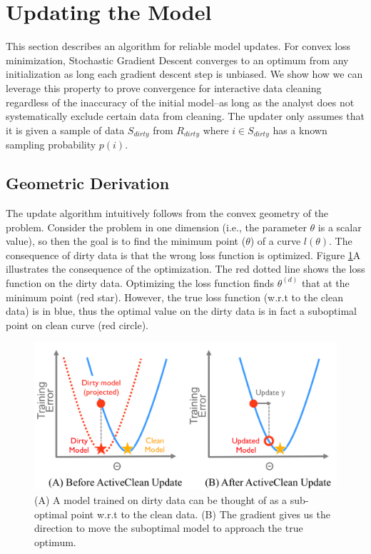 \section{Updating the Model}\label{model-update}
This section describes an algorithm for reliable model updates.
For convex loss minimization, Stochastic Gradient Descent converges to an optimum from any initialization as long each gradient descent step is unbiased.
We show how we can leverage this property to prove convergence for interactive data cleaning regardless of the inaccuracy of the initial model--as long as the analyst does not systematically exclude certain data from cleaning. 
The updater only assumes that it is given a sample of data $S_{dirty}$ from $R_{dirty}$ where $i \in S_{dirty}$ has a known sampling probability $p(i)$.

\subsection{Geometric Derivation}\label{geod}
The update algorithm intuitively follows from the convex geometry of the problem.
Consider the problem in one dimension (i.e., the parameter $\theta$ is a scalar value), so then the goal is to find the minimum point ($\theta$) of a curve $l(\theta)$.
The consequence of dirty data is that the wrong loss function is optimized.
Figure \ref{update-arch2}A illustrates the consequence of the optimization.
The red dotted line shows the loss function on the dirty data.
Optimizing the loss function finds $\theta^{(d)}$ that at the minimum point (red star).
However, the true loss function (w.r.t to the clean data) is in blue, thus
the optimal value on the dirty data is in fact a suboptimal point on clean curve (red circle).

\begin{figure}[ht!]
\centering
 \includegraphics[width=\columnwidth]{figs/update-arch2.png}\vspace{-1em}
 \caption{(A) A model trained on dirty data can be thought of as a sub-optimal point w.r.t to the clean data. (B) The gradient gives us the direction to move the suboptimal model to approach the true optimum. \label{update-arch2}}\vspace{-1em}
\end{figure}

